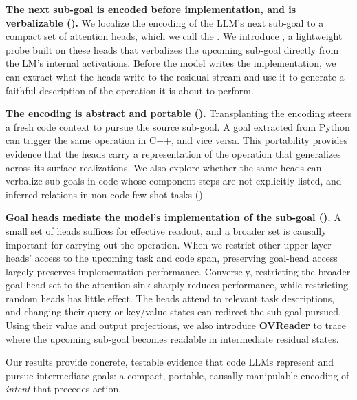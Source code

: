 \textbf{The next sub-goal is encoded before implementation, and is verbalizable ().} We localize the encoding of the LLM's next sub-goal to a compact set of attention heads, which we call the \goalheads. We introduce \goalscope, a lightweight probe built on these heads that verbalizes the upcoming sub-goal directly from the LM's internal activations. Before the model writes the implementation, we can extract what the heads write to the residual stream and use it to generate a faithful description of the operation it is about to perform.

\textbf{The encoding is abstract and portable ().} Transplanting the encoding steers a fresh code context to pursue the source sub-goal. A goal extracted from Python can trigger the same operation in C++, and vice versa. This portability provides evidence that the heads carry a representation of the operation that generalizes across its surface realizations. We also explore whether the same heads can verbalize sub-goals in code whose component steps are not explicitly listed, and inferred relations in non-code few-shot tasks ().

\textbf{Goal heads mediate the model's implementation of the sub-goal ().} A small set of heads suffices for effective readout, and a broader set is causally important for carrying out the operation. When we restrict other upper-layer heads' access to the upcoming task and code span, preserving goal-head access largely preserves implementation performance. Conversely, restricting the broader goal-head set to the attention sink sharply reduces performance, while restricting random heads has little effect. The heads attend to relevant task descriptions, and changing their query or key/value states can redirect the sub-goal pursued. Using their value and output projections, we also introduce \textbf{OVReader} to trace where the upcoming sub-goal becomes readable in intermediate residual states.

Our results provide concrete, testable evidence that code LLMs represent and pursue intermediate goals: a compact, portable, causally manipulable encoding of \emph{intent} that precedes action.
